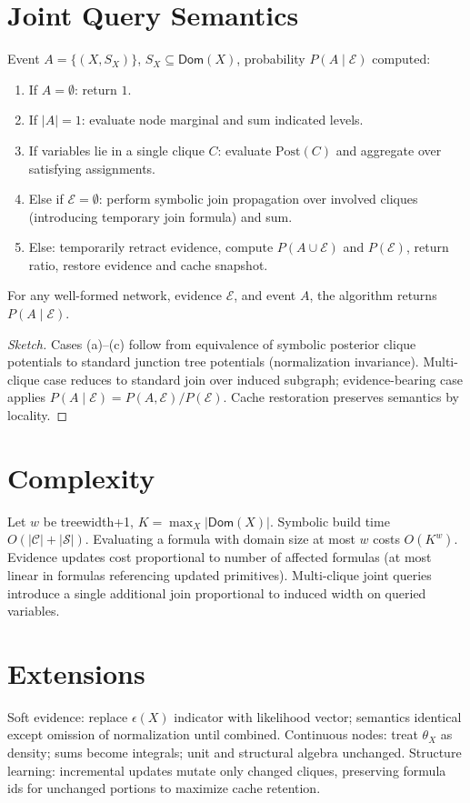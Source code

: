 \documentclass[11pt]{article}
\newcommand{\Dom}{\mathsf{Dom}}
\newcommand{\Evidence}{\mathcal{E}}
\newcommand{\cC}{\mathcal{C}}
\newcommand{\cS}{\mathcal{S}}
\newcommand{\Evid}{\epsilon}
\begin{document}
\section{Joint Query Semantics}
Event $A=\{ (X,S_X) \}$, $S_X \subseteq \Dom(X)$, probability $P(A\mid \Evidence)$ computed:
\begin{enumerate}[label=(\alph*)]
	\item If $A=\emptyset$: return $1$.
	\item If $|A|=1$: evaluate node marginal and sum indicated levels.
	\item If variables lie in a single clique $C$: evaluate $\mathrm{Post}(C)$ and aggregate over satisfying assignments.
	\item Else if $\Evidence=\emptyset$: perform symbolic join propagation over involved cliques (introducing temporary join formula) and sum.
	\item Else: temporarily retract evidence, compute $P(A\cup \Evidence)$ and $P(\Evidence)$, return ratio, restore evidence and cache snapshot.
\end{enumerate}

\begin{theorem}[Correctness]
For any well-formed network, evidence $\Evidence$, and event $A$, the algorithm returns $P(A\mid \Evidence)$.
\end{theorem}
\begin{proof}[Sketch]
Cases (a)--(c) follow from equivalence of symbolic posterior clique potentials to standard junction tree potentials (normalization invariance). Multi-clique case reduces to standard join over induced subgraph; evidence-bearing case applies $P(A\mid \Evidence)=P(A,\Evidence)/P(\Evidence)$. Cache restoration preserves semantics by locality.
\end{proof}

\section{Complexity}
Let $w$ be treewidth+1, $K=\max_X |\Dom(X)|$. Symbolic build time $O(|\cC| + |\cS|)$. Evaluating a formula with domain size at most $w$ costs $O(K^w)$. Evidence updates cost proportional to number of affected formulas (at most linear in formulas referencing updated primitives). Multi-clique joint queries introduce a single additional join proportional to induced width on queried variables.

\section{Extensions}
Soft evidence: replace $\Evid(X)$ indicator with likelihood vector; semantics identical except omission of normalization until combined. Continuous nodes: treat $\theta_X$ as density; sums become integrals; unit and structural algebra unchanged. Structure learning: incremental updates mutate only changed cliques, preserving formula ids for unchanged portions to maximize cache retention.
\end{document}
